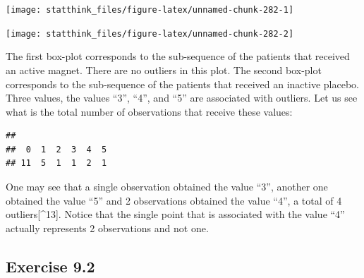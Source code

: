 \documentclass[
]{krantz}
\makeatletter
\newenvironment{Shaded}{\begin{snugshade}}{\end{snugshade}}
\newcommand{\DecValTok}[1]{\textcolor[rgb]{0.00,0.00,0.81}{#1}}
\newcommand{\KeywordTok}[1]{\textcolor[rgb]{0.13,0.29,0.53}{\textbf{#1}}}
\newcommand{\NormalTok}[1]{#1}
\newcommand{\OperatorTok}[1]{\textcolor[rgb]{0.81,0.36,0.00}{\textbf{#1}}}
\newenvironment{kframe}{%
\medskip{}
\setlength{\fboxsep}{.8em}
 \def\at@end@of@kframe{}%
 \ifinner\ifhmode%
  \def\at@end@of@kframe{\end{minipage}}%
  \begin{minipage}{\columnwidth}%
 \fi\fi%
 \def\FrameCommand##1{\hskip\@totalleftmargin \hskip-\fboxsep
 \colorbox{shadecolor}{##1}\hskip-\fboxsep
     \hskip-\linewidth \hskip-\@totalleftmargin \hskip\columnwidth}%
 \MakeFramed {\advance\hsize-\width
   \@totalleftmargin\z@ \linewidth\hsize
   \@setminipage}}%
 {\par\unskip\endMakeFramed%
 \at@end@of@kframe}
\renewenvironment{Shaded}{\begin{kframe}}{\end{kframe}}
\theoremstyle{definition}
\theoremstyle{definition}
\theoremstyle{definition}
\theoremstyle{remark}
\makeatother
\begin{document}
\begin{enumerate}
  \begin{center}\texttt{[image: statthink\_files/figure-latex/unnamed-chunk-282-1]} \end{center}

\begin{Shaded}
\end{Shaded}

  \begin{center}\texttt{[image: statthink\_files/figure-latex/unnamed-chunk-282-2]} \end{center}

  The first box-plot
  corresponds to the sub-sequence of the patients that received
  an active magnet. There are no outliers in this plot. The second box-plot
  corresponds to the sub-sequence of the patients that received
  an inactive placebo. Three values, the values ``3'', ``4'', and ``5'' are
  associated with outliers. Let us see what is the total number of
  observations that receive these values:

\begin{Shaded}
\end{Shaded}

\begin{verbatim}
## 
##  0  1  2  3  4  5 
## 11  5  1  1  2  1
\end{verbatim}

  One may see that a single observation obtained the value ``3'', another
  one obtained the value ``5'' and 2 observations obtained the value ``4'', a
  total of 4 outliers{[}\^{}13{]}. Notice that the single point that is
  associated with the value ``4'' actually represents 2 observations and not
  one.
\end{enumerate}

\hypertarget{exercise-9.2}{%
\subsection*{Exercise 9.2}\label{exercise-9.2}}
\end{document}
